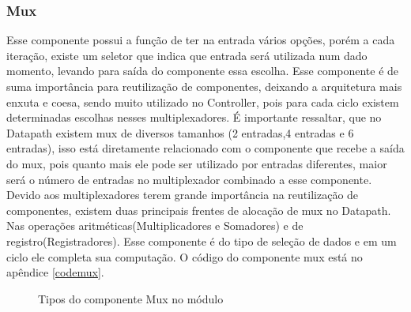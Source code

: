 \subsubsection{Mux}
Esse componente possui a função de ter na entrada vários opções, porém a cada iteração, existe um seletor que indica que entrada será utilizada num dado momento, levando para saída do componente essa escolha. Esse componente é de suma importância para reutilização de componentes, deixando a arquitetura mais enxuta e coesa, sendo muito utilizado no Controller, pois para cada ciclo existem determinadas escolhas nesses multiplexadores. É importante ressaltar, que no Datapath existem mux de diversos tamanhos (2 entradas,4 entradas e 6 entradas), isso está diretamente relacionado com o componente que recebe a saída do mux, pois quanto mais ele pode ser utilizado por entradas diferentes, maior será o número de entradas no multiplexador combinado a esse componente. Devido aos multiplexadores terem grande importância na reutilização de componentes, existem duas principais frentes de alocação de mux no Datapath. Nas operações aritméticas(Multiplicadores e Somadores) e de registro(Registradores). Esse componente é do tipo de seleção de dados e em um ciclo ele completa sua computação. O código do componente mux está no apêndice \ref{codemux}.	

\begin{figure}[H]
	\centering
	\quad %
	\quad %
	\caption{Tipos do componente Mux no módulo 	}
	\label{fig01}
\end{figure}

